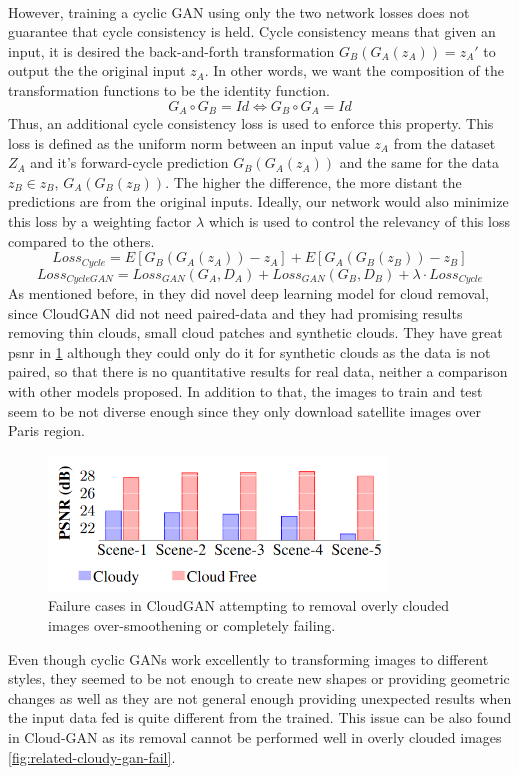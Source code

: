 \documentclass[../main.tex]{subfiles}
\begin{document}
\\
However, training a cyclic GAN using only the two network losses does not guarantee that cycle consistency is held. Cycle consistency means that given an input, it is desired the back-and-forth transformation $G_B(G_A(z_A)) = z_A'$ to output the the original input $z_A$.  In other words, we want the composition of the transformation functions to be the identity function.
\[G_A \circ G_B = Id \Longleftrightarrow G_B \circ G_A = Id\]
Thus, an additional cycle consistency loss is used to enforce this property. This loss is defined as the uniform norm between an input value $z_A$ from the dataset $Z_A$ and it's forward-cycle prediction $G_B(G_A(z_A))$ and the same for the data $z_B \in z_B$, $G_A(G_B(z_B))$. The higher the difference, the more distant the predictions are from the original inputs. Ideally, our network would also minimize this loss by a weighting factor $\lambda$ which is used to control the relevancy of this loss compared to the others.
\[Loss_{Cycle} = E[G_B(G_A(z_A)) - z_A] + E[G_A(G_B(z_B)) - z_B] \] 
\[Loss_{CycleGAN} = Loss_{GAN}(G_A, D_A) + Loss_{GAN}(G_B, D_B) + \lambda \cdot Loss_{Cycle}\]
As mentioned before, in \cite{cloud-gan} they did novel deep learning model for cloud removal, since CloudGAN did not need paired-data and they had promising results removing thin clouds, small cloud patches and synthetic clouds. They have great \gls{psnr} in \ref{fig:related-cycle-psnr} although they could only do it for synthetic clouds as the data is not paired, so that there is no quantitative results for real data, neither a comparison with other models proposed. In addition to that, the images to train and test seem to be not diverse enough since they only download satellite images over Paris region.
\begin{figure}[H]
	\centering
	\includegraphics[width=9cm]{imgs/relatedwork/cycle-gan-psnr.png}
	\caption{Failure cases in CloudGAN attempting to removal overly clouded images over-smoothening or completely failing.}
	\label{fig:related-cycle-psnr}
\end{figure}
Even though cyclic GANs work excellently to transforming images to different styles, they seemed to be not enough to create new shapes or providing geometric changes as well as they are not general enough providing unexpected results when the input data fed is quite different from the trained. This issue can be also found in Cloud-GAN as its removal cannot be performed well in overly clouded images \ref{fig:related-cloudy-gan-fail}.
\end{document}
